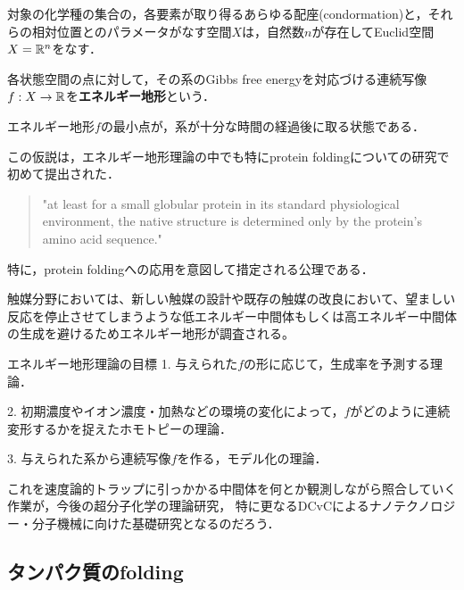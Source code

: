 \documentclass[uplatex, dvipdfmx]{jsreport}
\begin{document}
\begin{definition}
    対象の化学種の集合の，各要素が取り得るあらゆる配座(condormation)と，それらの相対位置とのパラメータがなす空間$X$は，自然数$n$が存在してEuclid空間$X=\mathbb{R}^n$をなす．
\end{definition}
\begin{definition}
    各状態空間の点に対して，その系のGibbs free energyを対応づける連続写像$f:X\to\mathbb{R}$を\textbf{エネルギー地形}という．
\end{definition}
\begin{axiom}\label{axiom-Anfinsen's dogma}
    エネルギー地形$f$の最小点が，系が十分な時間の経過後に取る状態である．
\end{axiom}
\begin{remark}
    この仮説は，エネルギー地形理論の中でも特にprotein foldingについての研究で初めて提出された．
    \begin{quote}
        "at least for a small globular protein in its standard physiological environment, the native structure is determined only by the protein's amino acid sequence."\cite{Anfinsen}
    \end{quote}
    特に，protein foldingへの応用を意図して措定される公理である．
\end{remark}

\begin{application}[触媒化学]
    触媒分野においては、新しい触媒の設計や既存の触媒の改良において、望ましい反応を停止させてしまうような低エネルギー中間体もしくは高エネルギー中間体の生成を避けるためエネルギー地形が調査される\cite{触媒化学}。
\end{application}

\begin{itembox}[l]{エネルギー地形理論の目標}
    1. 与えられた$f$の形に応じて，生成率を予測する理論．

    2. 初期濃度やイオン濃度・加熱などの環境の変化によって，$f$がどのように連続変形するかを捉えたホモトピーの理論．

    3. 与えられた系から連続写像$f$を作る，モデル化の理論．

    これを速度論的トラップに引っかかる中間体を何とか観測しながら照合していく作業が，今後の超分子化学の理論研究，
    特に更なるDCvCによるナノテクノロジー・分子機械に向けた基礎研究となるのだろう．
\end{itembox}

\subsection{タンパク質のfolding}
\end{document}
